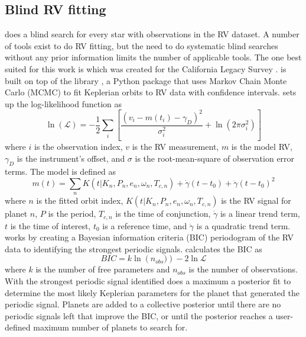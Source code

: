 \subsection{Blind RV fitting}

 does a blind search for every star with observations in the
RV dataset. A number of tools exist to do RV fitting, but the need to do systematic blind
searches without any prior information limits the number of applicable tools. The one
best suited for this work is  which was created for the
California Legacy Survey \citep{rosenthalCaliforniaLegacy2021}. 
is built on top of the 
library \citep{fultonRadvelRadialVelocity2018}, a Python package that uses
Markov Chain Monte Carlo (MCMC) to fit Keplerian orbits to RV data
with confidence intervals.  sets up the log-likelihood function
as \citep{rosenthalCaliforniaLegacy2021} 
\begin{equation}
\ln(\mathcal{L}) = -\frac{1}{2}
\sum_i \left[ \frac{\left(v_i - m(t_i) - \gamma_D\right)^2}{\sigma_i^2} +
\ln\left(2 \pi \sigma_i^2\right)\right]
  \label{eq:likelihoodfun}
\end{equation}
where $i$ is the observation index,
$v$ is the RV measurement, $m$ is the model RV, $\gamma_D$ is the instrument's
offset, and $\sigma$ is the root-mean-square of observation error terms. The
model is defined as 
\begin{equation}
m(t) = \sum_n K(t|K_n,P_n,e_n,\omega_n,T_{c,n}) +
\dot{\gamma}(t-t_0) + \ddot{\gamma}(t-t_0)^2
  \label{eq:rv_model}
\end{equation}
where $n$ is the fitted orbit
index, $K(t|K_n,P_n,e_n,\omega_n,T_{c,n})$ is the RV signal for planet $n$, $P$
is the period, $T_{c,n}$ is the time of conjunction, $\dot{\gamma}$ is a linear
trend term, $t$ is the time of interest, $t_0$ is a reference time, and
$\ddot{\gamma}$ is a quadratic trend term.  works by creating a
Bayesian information criteria (BIC) periodogram of the RV data to identifying
the strongest periodic signals.  calculates the BIC as 
\begin{equation}
BIC = k
\ln\left(n_{obs})\right) - 2\ln{\mathcal{L}}
  \label{eq:bic}
\end{equation}
where $k$ is the number of free parameters and $n_{obs}$ is the number of
observations. With the strongest periodic signal identified 
does a maximum a posterior fit to determine the most likely Keplerian
parameters for the planet that generated the periodic signal. Planets are added
to a collective posterior until there are no periodic signals left that improve
the BIC, or until the  posterior reaches a user-defined maximum
number of planets to search for.

